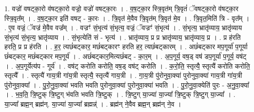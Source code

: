 \documentclass[17pt]{extarticle}
\begin{document}
1. वज्रो॑ वषट्का॒रो व॑षट्का॒रो वज्रो॒ वज्रो॑ वषट्का॒रः । . व॒ष॒ट्का॒र स्त्रि॒वृत॑म् त्रि॒वृतं॑ ॅवषट्का॒रो व॑षट्का॒र स्त्रि॒वृत᳚म् । . व॒ष॒ट्का॒र इति॑ वषट् - का॒रः । . त्रि॒वृत॑ मे॒वैव त्रि॒वृत॑म् त्रि॒वृत॑ मे॒व । . त्रि॒वृत॒मिति॑ त्रि - वृत᳚म् । . ए॒व वज्रं॒ ॅवज्र॑ मे॒वैव वज्र᳚म् । . वज्रꣳ॑ सं॒भृत्य॑ सं॒भृत्य॒ वज्रं॒ ॅवज्रꣳ॑ सं॒भृत्य॑ । . सं॒भृत्य॒ भ्रातृ॑व्याय॒ भ्रातृ॑व्याय सं॒भृत्य॑ सं॒भृत्य॒ भ्रातृ॑व्याय । . सं॒भृत्येति॑ सं - भृत्य॑ । . भ्रातृ॑व्याय॒ प्र प्र भ्रातृ॑व्याय॒ भ्रातृ॑व्याय॒ प्र । . प्र ह॑रति हरति॒ प्र प्र ह॑रति । . ह॒र॒ त्यछं॑बट्कार॒ मछं॑बट्कारꣳ हरति हर॒ त्यछं॑बट्कारम् । . अछं॑बट्कार मप॒गूर्या॑ प॒गूर्या छं॑बट्कार॒ मछं॑बट्कार मप॒गूर्य॑ । . अछं॑बट्कार॒मित्यछं॑बट् - का॒र॒म् । . अ॒प॒गूर्य॒ वष॒ड् वष॑ डप॒गूर्या॑ प॒गूर्य॒ वष॑ट् । . अ॒प॒गूर्येत्य॑प - गूर्य॑ । . वष॑ट् करोति करोति॒ वष॒ड् वष॑ट् करोति । . क॒रो॒ति॒ स्तृत्यै॒ स्तृत्यै॑ करोति करोति॒ स्तृत्यै᳚ । . स्तृत्यै॑ गाय॒त्री गा॑य॒त्री स्तृत्यै॒ स्तृत्यै॑ गाय॒त्री । . गा॒य॒त्री पु॑रोनुवा॒क्या॑ पुरोनुवा॒क्या॑ गाय॒त्री गा॑य॒त्री पु॑रोनुवा॒क्या᳚ । . पु॒रो॒नु॒वा॒क्या॑ भवति भवति पुरोनुवा॒क्या॑ पुरोनुवा॒क्या॑ भवति । . पु॒रो॒नु॒वा॒क्येति॑ पुरः - अ॒नु॒वा॒क्या᳚ । . भ॒व॒ति॒ त्रि॒ष्टुक् त्रि॒ष्टुग् भ॑वति भवति त्रि॒ष्टुक् । . त्रि॒ष्टुग् या॒ज्या॑ या॒ज्या᳚ त्रि॒ष्टुक् त्रि॒ष्टुग् या॒ज्या᳚ । . या॒ज्या᳚ ब्रह्म॒न् ब्रह्म॑न्. या॒ज्या॑ या॒ज्या᳚ ब्रह्मन्न्॑ । . ब्रह्म॑न् ने॒वैव ब्रह्म॒न् ब्रह्म॑न् ने॒व । \newline
\end{document}
